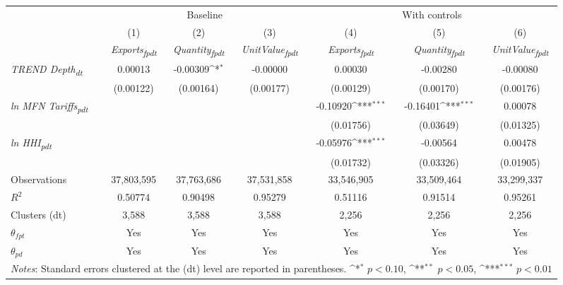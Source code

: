 {
\def\sym#1{\ifmmode^{#1}\else\(^{#1}\)\fi}
\begin{tabular}{l*{6}{c}}
\toprule
&\multicolumn{3}{c}{Baseline}&\multicolumn{3}{c}{With controls}\\\cmidrule(lr){2-4}\cmidrule(lr){5-7}
&(1)&(2)&(3)&(4)&(5)&(6)\\
&\textit{Exports\textsubscript{fpdt}}&\textit{Quantity\textsubscript{fpdt}}&\textit{UnitValue\textsubscript{fpdt}}&\textit{Exports\textsubscript{fpdt}}&\textit{Quantity\textsubscript{fpdt}}&\textit{UnitValue\textsubscript{fpdt}}\\
\midrule
\textit{TREND Depth\textsubscript{dt}} & 0.00013 & -0.00309\sym{*} & -0.00000 & 0.00030 & -0.00280 & -0.00080\\
 & (0.00122) & (0.00164) & (0.00177) & (0.00129) & (0.00170) & (0.00176)\\
\addlinespace
\textit{ln MFN Tariffs\textsubscript{pdt}} &  &  &  & -0.10920\sym{***} & -0.16401\sym{***} & 0.00078\\
 &  &  &  & (0.01756) & (0.03649) & (0.01325)\\
\addlinespace
\textit{ln HHI\textsubscript{pdt}} &  &  &  & -0.05976\sym{***} & -0.00564 & 0.00478\\
 &  &  &  & (0.01732) & (0.03326) & (0.01905)\\
\midrule
Observations & 37,803,595 & 37,763,686 & 37,531,858 & 33,546,905 & 33,509,464 & 33,299,337\\
$R^{2}$ & 0.50774 & 0.90498 & 0.95279 & 0.51116 & 0.91514 & 0.95261\\
Clusters (dt) & 3,588 & 3,588 & 3,588 & 2,256 & 2,256 & 2,256\\
$\theta_{fpt}$ & Yes & Yes & Yes & Yes & Yes & Yes\\
$\theta_{pd}$ & Yes & Yes & Yes & Yes & Yes & Yes\\
\bottomrule
\multicolumn{7}{l}{\footnotesize \textit{Notes}: Standard errors clustered at the (dt) level are reported in parentheses. \sym{*} \(p<0.10\), \sym{**} \(p<0.05\), \sym{***} \(p<0.01\)}\\
\end{tabular}
}
